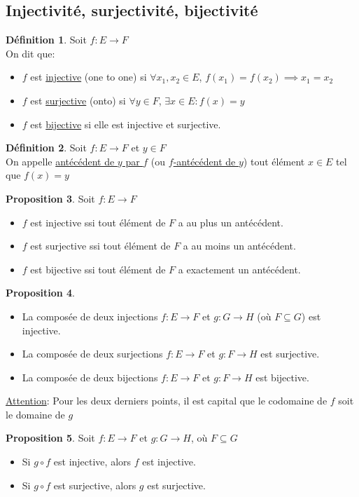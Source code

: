 \documentclass[10pt,a4paper]{article}
\theoremstyle{definition}
\newtheorem{proposition}{Proposition}[section]
\newtheorem{definition}[proposition]{Définition}
\begin{document}
\subsection{Injectivité, surjectivité, bijectivité}
\begin{definition}
Soit $f: E \to F$ \\
On dit que:
\begin{itemize}
\item $f$ est \uline{injective} (one to one) si $\forall x_1, x_2 \in E$, $f(x_1) = f(x_2) \implies x_1 = x_2$
\item $f$ est \uline{surjective} (onto) si $\forall y \in F$, $\exists x \in E: f(x) = y$
\item $f$ est \uline{bijective} si elle est injective et surjective.
\end{itemize}
\end{definition}
\begin{definition}
Soit $f: E \to F$ et $y \in F$ \\
On appelle \uline{antécédent de $y$ par $f$} (ou \uline{$f$-antécédent de $y$}) tout élément $x \in E$ tel que $f(x) = y$
\end{definition}
\begin{proposition}
Soit $f: E \to F$
\begin{itemize}
\item $f$ est injective ssi tout élément de $F$ a au plus un antécédent.
\item $f$ est surjective ssi tout élément de $F$ a au moins un antécédent.
\item $f$ est bijective ssi tout élément de $F$ a exactement un antécédent.
\end{itemize}
\end{proposition}
\begin{proposition}
\hfill
\begin{itemize}
\item La composée de deux injections $f: E \to F$ et $g: G \to H$ (où $F \subseteq G$) est injective.
\item La composée de deux surjections $f: E \to F$ et $g: F \to H$ est surjective.
\item La composée de deux bijections $f: E \to F$ et $g: F \to H$ est bijective.
\end{itemize}
\end{proposition}
\noindent \uline{Attention}: Pour les deux derniers points, il est capital que le codomaine de $f$ soit le domaine de $g$
\begin{proposition}
Soit $f: E \to F$ et $g: G \to H$, où $F \subseteq G$
\begin{itemize}
\item Si $g \circ f$ est injective, alors $f$ est injective.
\item Si $g \circ f$ est surjective, alors $g$ est surjective.
\end{itemize}
\end{proposition}
\end{document}
